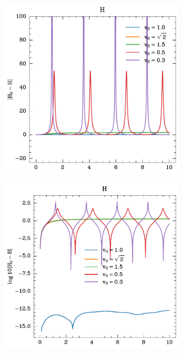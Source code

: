 \begin{figure}
    \centering
    \begin{subfigure}{0.49\textwidth}
        \includegraphics[width=\textwidth]{../images/1-1-H_lin.pdf}
    \end{subfigure}
    \hfill
    \begin{subfigure}{0.49\textwidth}
        \includegraphics[width=\textwidth]{../images/1-1-H_log.pdf}

\end{subfigure}
\end{figure}
